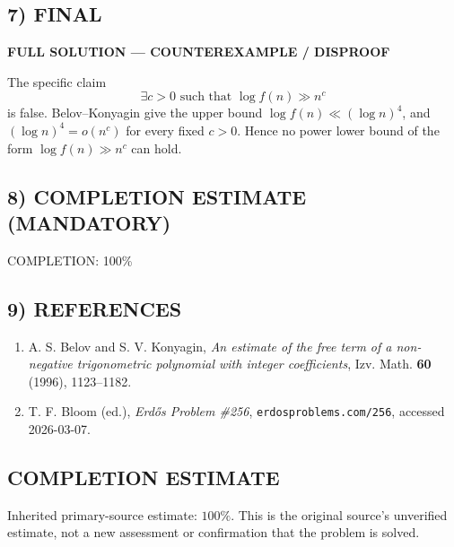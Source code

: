 \subsection*{7) FINAL}
\textbf{FULL SOLUTION --- COUNTEREXAMPLE / DISPROOF}

The specific claim
\[
\exists c>0\text{ such that }\log f(n)\gg n^c
\]
is false. Belov--Konyagin give the upper bound $\log f(n)\ll (\log n)^4$, and $(\log n)^4=o(n^c)$ for every fixed $c>0$. Hence no power lower bound of the form $\log f(n)\gg n^c$ can hold.

\subsection*{8) COMPLETION ESTIMATE (MANDATORY)}
COMPLETION: 100\%

\subsection*{9) REFERENCES}
\begin{enumerate}
\item A. S. Belov and S. V. Konyagin, \emph{An estimate of the free term of a non-negative trigonometric polynomial with integer coefficients}, Izv. Math. \textbf{60} (1996), 1123--1182.
\item T. F. Bloom (ed.), \emph{Erd\H{o}s Problem \#256}, \texttt{erdosproblems.com/256}, accessed 2026-03-07.
\end{enumerate}



\subsection*{COMPLETION ESTIMATE}
Inherited primary-source estimate: $100\%$. This is the original source's unverified estimate, not a new assessment or confirmation that the problem is solved.

